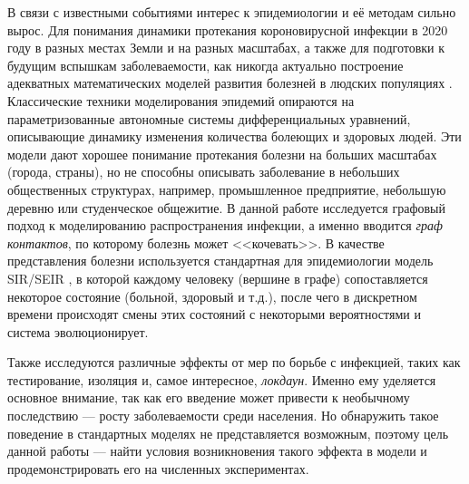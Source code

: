 	В связи с известными событиями интерес к эпидемиологии и её методам сильно вырос. Для понимания динамики протекания короновирусной инфекции в 2020 году в разных местах Земли и на разных масштабах, а также для подготовки к будущим вспышкам заболеваемости, как никогда актуально построение адекватных математических моделей развития болезней в людских популяциях \cite{COLIZZA2007364}. Классические техники моделирования эпидемий опираются на параметризованные автономные системы дифференциальных уравнений, описывающие динамику изменения количества болеющих и здоровых людей. Эти модели дают хорошее понимание протекания болезни на больших масштабах (города, страны), но не способны описывать заболевание в небольших общественных структурах, например, промышленное предприятие, небольшую деревню или студенческое общежитие. В данной работе исследуется графовый подход к моделированию распространения инфекции, а именно вводится \textit{граф контактов}, по которому болезнь может <<кочевать>>. В качестве представления болезни используется стандартная для эпидемиологии модель SIR/SEIR \cite{seirsplus}, в которой каждому человеку (вершине в графе) сопоставляется некоторое состояние (больной, здоровый и т.д.), после чего в дискретном времени происходят смены этих состояний с некоторыми вероятностями и система эволюционирует.
	
	Также исследуются различные эффекты от мер по борьбе с инфекцией, таких как тестирование, изоляция и, самое интересное, \textit{локдаун}. Именно ему уделяется основное внимание, так как его введение может привести к необычному последствию --- росту заболеваемости среди населения. Но обнаружить такое поведение в стандартных моделях не представляется возможным, поэтому цель данной работы --- найти условия возникновения такого эффекта в модели и продемонстрировать его на численных экспериментах. 
	
